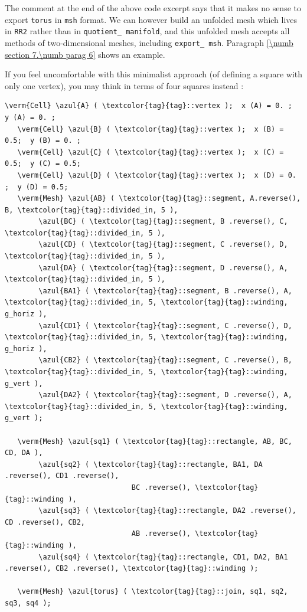 The comment at the end of the above code excerpt says that it makes no sense to export
{\small\tt torus} in {\small\tt msh} format.
We can however build an unfolded mesh which lives in {\small\tt RR2} rather than in
{\small\tt quotient\_\,manifold}, and this unfolded mesh accepts all methods of two-dimensional
meshes, including {\small\tt export\_\,msh}.
Paragraph \ref{\numb section 7.\numb parag 6} shows an example.

If you feel uncomfortable with this minimalist approach (of defining a square with only one
vertex), you may think in terms of four squares instead :

\begin{Verbatim}[commandchars=\\\{\},formatcom=\small\tt,
   baselinestretch=0.94,framesep=2mm                      ]
   \verm{Cell} \azul{A} ( \textcolor{tag}{tag}::vertex );  x (A) = 0. ;  y (A) = 0. ;
   \verm{Cell} \azul{B} ( \textcolor{tag}{tag}::vertex );  x (B) = 0.5;  y (B) = 0. ;
   \verm{Cell} \azul{C} ( \textcolor{tag}{tag}::vertex );  x (C) = 0.5;  y (C) = 0.5;
   \verm{Cell} \azul{D} ( \textcolor{tag}{tag}::vertex );  x (D) = 0. ;  y (D) = 0.5;
   \verm{Mesh} \azul{AB} ( \textcolor{tag}{tag}::segment, A.reverse(), B, \textcolor{tag}{tag}::divided_in, 5 ),
        \azul{BC} ( \textcolor{tag}{tag}::segment, B .reverse(), C, \textcolor{tag}{tag}::divided_in, 5 ),
        \azul{CD} ( \textcolor{tag}{tag}::segment, C .reverse(), D, \textcolor{tag}{tag}::divided_in, 5 ),
        \azul{DA} ( \textcolor{tag}{tag}::segment, D .reverse(), A, \textcolor{tag}{tag}::divided_in, 5 ),
        \azul{BA1} ( \textcolor{tag}{tag}::segment, B .reverse(), A, \textcolor{tag}{tag}::divided_in, 5, \textcolor{tag}{tag}::winding, g_horiz ),
        \azul{CD1} ( \textcolor{tag}{tag}::segment, C .reverse(), D, \textcolor{tag}{tag}::divided_in, 5, \textcolor{tag}{tag}::winding, g_horiz ),
        \azul{CB2} ( \textcolor{tag}{tag}::segment, C .reverse(), B, \textcolor{tag}{tag}::divided_in, 5, \textcolor{tag}{tag}::winding, g_vert ),
        \azul{DA2} ( \textcolor{tag}{tag}::segment, D .reverse(), A, \textcolor{tag}{tag}::divided_in, 5, \textcolor{tag}{tag}::winding, g_vert );

   \verm{Mesh} \azul{sq1} ( \textcolor{tag}{tag}::rectangle, AB, BC, CD, DA ),
        \azul{sq2} ( \textcolor{tag}{tag}::rectangle, BA1, DA .reverse(), CD1 .reverse(),
                              BC .reverse(), \textcolor{tag}{tag}::winding ),
        \azul{sq3} ( \textcolor{tag}{tag}::rectangle, DA2 .reverse(), CD .reverse(), CB2,
                              AB .reverse(), \textcolor{tag}{tag}::winding ),
        \azul{sq4} ( \textcolor{tag}{tag}::rectangle, CD1, DA2, BA1 .reverse(), CB2 .reverse(), \textcolor{tag}{tag}::winding );
	
   \verm{Mesh} \azul{torus} ( \textcolor{tag}{tag}::join, sq1, sq2, sq3, sq4 );
\end{Verbatim}

